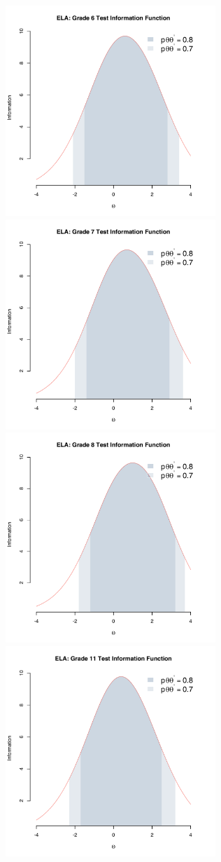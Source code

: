 \documentclass[]{article}
\begin{document}
\includegraphics[width=\textwidth,height=3.125in]{tifs/ela6tif.pdf}
\includegraphics[width=\textwidth,height=3.125in]{tifs/ela7tif.pdf}
\includegraphics[width=\textwidth,height=3.125in]{tifs/ela8tif.pdf}
\includegraphics[width=\textwidth,height=3.125in]{tifs/ela11tif.pdf}
\newpage
\end{document}
